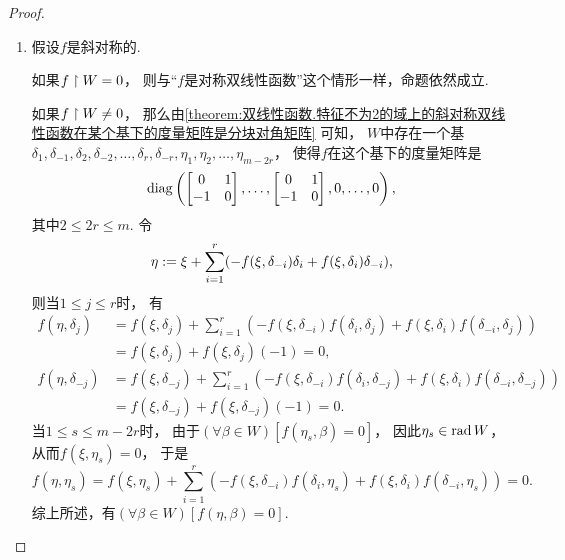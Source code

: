 \begin{example}
\begin{proof}
\begin{enumerate}
	\item 假设\(f\)是斜对称的.

	如果\(f \upharpoonright W = 0\)，
	则与“\(f\)是对称双线性函数”这个情形一样，命题依然成立.

	如果\(f \upharpoonright W \neq 0\)，
	那么由\cref{theorem:双线性函数.特征不为2的域上的斜对称双线性函数在某个基下的度量矩阵是分块对角矩阵} 可知，
	\(W\)中存在一个基\(
		\delta_1, \allowbreak
		\delta_{-1}, \allowbreak
		\delta_2, \allowbreak
		\delta_{-2}, \allowbreak
		\dotsc, \allowbreak
		\delta_r, \allowbreak
		\delta_{-r}, \allowbreak
		\eta_1, \allowbreak
		\eta_2, \allowbreak
		\dotsc, \allowbreak
		\eta_{m-2r}
	\)，
	使得\(f\)在这个基下的度量矩阵是\begin{equation*}
		\def\MatrixChunk{\begin{bmatrix}
			0 & 1 \\
			-1 & 0
		\end{bmatrix}}
		\diag\left(
			\MatrixChunk,
			\dotsc,
			\MatrixChunk,
			0,
			\dotsc,
			0
		\right),
	\end{equation*}
	其中\(2 \leq 2r \leq m\).
	令\begin{equation*}
		\eta
		:=
		\xi + \sum_{i=1}^r (
			-f(\xi,\delta_{-i}) \delta_i
			+f(\xi,\delta_i) \delta_{-i}
		),
	\end{equation*}
	则当\(1 \leq j \leq r\)时，
	有\begin{align*}
		f(\eta,\delta_j)
		&= f(\xi,\delta_j)
		+ \sum_{i=1}^r (
			-f(\xi,\delta_{-i}) f(\delta_i,\delta_j)
			+f(\xi,\delta_i) f(\delta_{-i},\delta_j)
		) \\
		&= f(\xi,\delta_j)
		+ f(\xi,\delta_j) (-1)
		= 0, \\
		f(\eta,\delta_{-j})
		&= f(\xi,\delta_{-j})
		+ \sum_{i=1}^r (
			-f(\xi,\delta_{-i}) f(\delta_i,\delta_{-j})
			+f(\xi,\delta_i) f(\delta_{-i},\delta_{-j})
		) \\
		&= f(\xi,\delta_{-j})
		+ f(\xi,\delta_{-j}) (-1)
		= 0.
	\end{align*}
	当\(1 \leq s \leq m-2r\)时，
	由于\((\forall \beta \in W)[f(\eta_s,\beta) = 0]\)，
	因此\(\eta_s \in \operatorname{rad} W\)，
	从而\(f(\xi,\eta_s) = 0\)，
	于是\begin{equation*}
		f(\eta,\eta_s)
		= f(\xi,\eta_s)
		+ \sum_{i=1}^r (
			-f(\xi,\delta_{-i}) f(\delta_i,\eta_s)
			+f(\xi,\delta_i) f(\delta_{-i},\eta_s)
		)
		= 0.
	\end{equation*}
	综上所述，有\((\forall \beta \in W)[f(\eta,\beta) = 0]\).
	\qedhere
\end{enumerate}
\end{proof}
\end{example}
